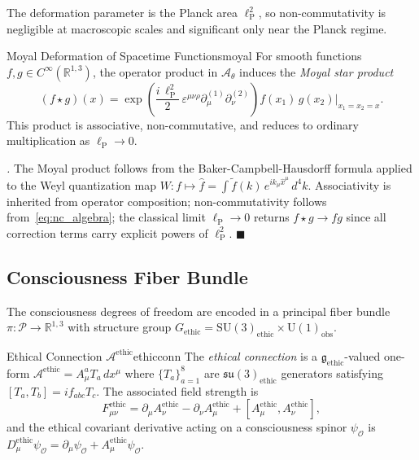 \documentclass[12pt,a4paper]{article}
\theoremstyle{myrmk}
\renewenvironment{proof}[1][\proofname]{%
  \par\noindent\textit{#1.}\enspace\ignorespaces}{\hfill$\blacksquare$\par\medskip}
\newcommand{\lP}{\ell_{\mathrm{P}}}
\begin{document}
The deformation parameter is the Planck area $\lP^2$, so non-commutativity is
negligible at macroscopic scales and significant only near the Planck regime.

\begin{lemma}{Moyal Deformation of Spacetime Functions}{moyal}
For smooth functions $f, g \in C^\infty(\mathbb{R}^{1,3})$, the operator product in
$\mathcal{A}_\theta$ induces the \emph{Moyal star product}
\begin{equation}
  (f \star g)(x) = \exp\!\left(\frac{i\,\lP^2}{2}\,\varepsilon^{\mu\nu\rho}
    \partial_\mu^{(1)} \partial_\nu^{(2)}\right) f(x_1)\,g(x_2)\Big|_{x_1=x_2=x}.
  \label{eq:moyal}
\end{equation}
This product is associative, non-commutative, and reduces to ordinary multiplication
as $\lP\to 0$.
\end{lemma}

\begin{proof}
The Moyal product follows from the Baker-Campbell-Hausdorff formula applied to the
Weyl quantization map $W: f \mapsto \hat{f} = \int \tilde{f}(k)\,e^{ik_\mu\hat{x}^\mu}\,d^4k$.
Associativity is inherited from operator composition; non-commutativity follows
from~\eqref{eq:nc_algebra}; the classical limit $\lP\to0$ returns $f\star g\to fg$
since all correction terms carry explicit powers of $\lP^2$.
\end{proof}

\subsection{Consciousness Fiber Bundle}

The consciousness degrees of freedom are encoded in a principal fiber bundle
$\pi:\mathcal{P}\to\mathbb{R}^{1,3}$ with structure group
$G_{\mathrm{ethic}} = \mathrm{SU}(3)_{\mathrm{ethic}}\times\mathrm{U}(1)_{\mathrm{obs}}$.

\begin{definition}{Ethical Connection $\mathcal{A}^{\mathrm{ethic}}$}{ethicconn}
The \emph{ethical connection} is a $\mathfrak{g}_{\mathrm{ethic}}$-valued one-form
$\mathcal{A}^{\mathrm{ethic}} = A^a_\mu T_a\,dx^\mu$
where $\{T_a\}_{a=1}^{8}$ are $\mathfrak{su}(3)_{\mathrm{ethic}}$ generators
satisfying $[T_a,T_b] = if_{abc}T_c$. The associated field strength is
\begin{equation}
  F^{\mathrm{ethic}}_{\mu\nu} = \partial_\mu A^{\mathrm{ethic}}_\nu
    - \partial_\nu A^{\mathrm{ethic}}_\mu
    + [A^{\mathrm{ethic}}_\mu, A^{\mathrm{ethic}}_\nu],
  \label{eq:ethical_fmunu}
\end{equation}
and the ethical covariant derivative acting on a consciousness spinor
$\psi_{\mathcal{O}}$ is
$D^\mathrm{ethic}_\mu\psi_{\mathcal{O}} = \partial_\mu\psi_{\mathcal{O}}
+ A^{\mathrm{ethic}}_\mu\psi_{\mathcal{O}}$.
\end{definition}
\end{document}
